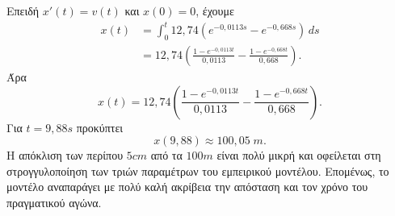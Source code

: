 \begin{alist}
  \item Επειδή $x'(t)=v(t)$ και $x(0)=0$, έχουμε
        \begin{align*}
          x(t)
          &=\int_0^t12{,}74
            \left(e^{-0{,}0113s}-e^{-0{,}668s}\right)\,ds\\
          &=12{,}74\left(
            \frac{1-e^{-0{,}0113t}}{0{,}0113}
            -\frac{1-e^{-0{,}668t}}{0{,}668}
          \right).
        \end{align*}
        Άρα
        \[
          {x(t)=12{,}74\left(
          \frac{1-e^{-0{,}0113t}}{0{,}0113}
          -\frac{1-e^{-0{,}668t}}{0{,}668}
          \right)}.
        \]
        Για $t=9{,}88\si{s}$ προκύπτει
        \[
          x(9{,}88)\approx100{,}05\;\si{m}.
        \]
        Η απόκλιση των περίπου $5\si{cm}$ από τα $100\si{m}$ είναι πολύ
        μικρή και οφείλεται στη στρογγυλοποίηση των τριών παραμέτρων του
        εμπειρικού μοντέλου. Επομένως, το μοντέλο αναπαράγει με πολύ
        καλή ακρίβεια την απόσταση και τον χρόνο του πραγματικού αγώνα.
\end{alist}
